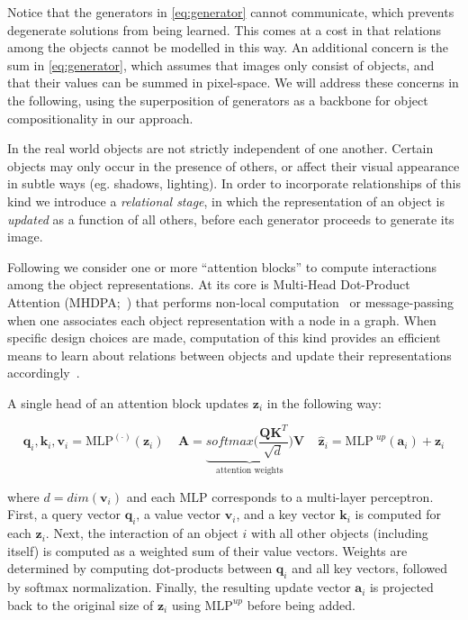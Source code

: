 \documentclass{article}
\begin{document}
Notice that the generators in \eqref{eq:generator} cannot communicate, which prevents degenerate solutions from being learned.
This comes at a cost in that relations among the objects cannot be modelled in this way.
An additional concern is the sum in \eqref{eq:generator}, which assumes that images only consist of objects, and that their values can be summed in pixel-space.
We will address these concerns in the following, using the superposition of generators as a backbone for object compositionality in our approach.


In the real world objects are not strictly independent of one another.
Certain objects may only occur in the presence of others, or affect their visual appearance in subtle ways (eg. shadows, lighting).
In order to incorporate relationships of this kind we introduce a \emph{relational stage}, in which the representation of an object is \emph{updated} as a function of all others, before each generator proceeds to generate its image. %

Following \cite{zambaldi2018relational} we consider one or more ``attention blocks'' to compute interactions among the object representations.
At its core is Multi-Head Dot-Product Attention (MHDPA;~\cite{vaswani2017attention}) that performs non-local computation~\citep{wang2018non} or message-passing~\citep{gilmer2017neural} when one associates each object representation with a node in a graph.
When specific design choices are made, computation of this kind provides an efficient means to learn about relations between objects and update their representations accordingly~\citep{battaglia2018relational}.

A single head of an attention block updates $\bm{z}_i$ in the following way:

\begin{equation}
    \bm{q}_i, \bm{k}_i, \bm{v}_i = \text{MLP}^{(\cdot)}(\bm{z}_i) \ \ \ \ \ \bm{A} = \underbrace{softmax\big(\frac{\bm{Q}\bm{K}^{T}}{\sqrt{d}}\big)}_{\text{attention weights}}\bm{V} \ \ \ \ \ \bm{\hat{z}}_i = \text{MLP}^{\textit{ up}}(\bm{a}_i) + \bm{z}_i
    \label{eq:attention_block}
\end{equation}

where $d=dim(\bm{v}_i)$ and each $\text{MLP}$ corresponds to a multi-layer perceptron. First, a query vector $\bm{q}_i$, a value vector $\bm{v}_i$, and a key vector $\bm{k}_i$ is computed for each $\bm{z}_i$.
Next, the interaction of an object $i$ with all other objects (including itself) is computed as a weighted sum of their value vectors.
Weights are determined by computing dot-products between $\bm{q}_i$ and all key vectors, followed by softmax normalization.
Finally, the resulting update vector $\bm{a}_i$ is projected back to the original size of $\bm{z}_i$ using $\text{MLP}^{\textit{up}}$ before being added.
\end{document}
